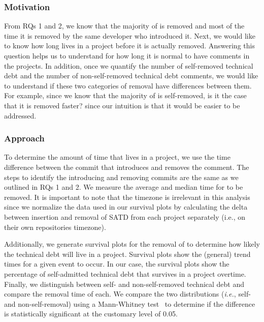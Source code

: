 \subsubsection*{Motivation} From RQs 1 and 2, we know that the majority of \SATD is removed and most of the time it is removed by the same developer who introduced it. Next, we would like to know how long \SATD lives in a project before it is actually removed. Answering this question helps us to understand for how long it is normal to have \SATD comments in the projects. In addition, once we quantify the number of self-removed technical debt and the number of non-self-removed technical debt comments, we would like to understand if these two categories of removal have differences between them. For example, since we know that the majority of \SATD is self-removed, is it the case that it is removed faster? since our intuition is that it would be easier to be addressed. 

\subsubsection*{Approach} To determine the amount of time that \SATD lives in a project, we use the time difference between the commit that introduces and removes the \SATD comment. The steps to identify the \SATD introducing and removing commits are the same as we outlined in RQs 1 and 2. We measure the average and median time for \SATD to be removed. It is important to note that the timezone is irrelevant in this analysis since we normalize the data used in our survival plots by calculating the delta between insertion and removal of SATD from each project separately (i.e., on their own repositories timezone).

Additionally, we generate survival plots for the removal of \SATD to determine how likely the technical debt will live in a project. Survival plots show the (general) trend times for a given event to occur. In our case, the survival plots show the  percentage of self-admitted technical debt that survives in a project overtime. Finally, we distinguish between self- and non-self-removed technical debt and compare the removal time of each. We compare the two distributions (\emph{i.e.}, self- and non-self-removal) using a Mann-Whitney test~\cite{mann1947test} to determine if the difference is statistically significant at the customary level of 0.05.

